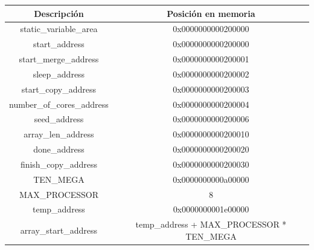 \begin{center}
    \begin{tabular}{|c|c|}
        \hline
        Descripción & Posición en memoria\\
        \hline
        static\_variable\_area & 0x0000000000200000\\
        \hline
        start\_address & 0x0000000000200000\\
        \hline
        start\_merge\_address & 0x0000000000200001\\
        \hline
        sleep\_address & 0x0000000000200002\\
        \hline
        start\_copy\_address & 0x0000000000200003\\
        \hline
        number\_of\_cores\_address & 0x0000000000200004\\
        \hline
        seed\_address & 0x0000000000200006\\
        \hline
        array\_len\_address & 0x0000000000200010\\
        \hline
        done\_address & 0x0000000000200020\\
        \hline
        finish\_copy\_address & 0x0000000000200030\\
        \hline
        TEN\_MEGA & 0x0000000000a00000\\
        \hline
        MAX\_PROCESSOR & 8\\
        \hline
        temp\_address & 0x0000000001e00000\\
        \hline
        array\_start\_address & temp\_address + MAX\_PROCESSOR * TEN\_MEGA\\
        \hline
    \end{tabular}
\end{center}
\vspace{0.5cm}